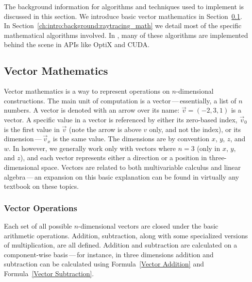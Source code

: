 The background information for algorithms and techniques used to implement \name{} is discussed in this section.
We introduce basic vector mathematics in Section~\ref{ch:intro:background:vector_math}.
In Section~\ref{ch:intro:background:raytracing_math} we detail most of the specific mathematical algorithms involved.
In \name{}, many of these algorithms are implemented behind the scene in APIs like OptiX and CUDA.

\subsection{Vector Mathematics}
\label{ch:intro:background:vector_math}

Vector mathematics is a way to represent operations on $n$-dimensional constructions.
The main unit of computation is a vector\,---\,essentially, a list of $n$ numbers.
A vector is denoted with an arrow over its name: $\vec{v} = (-2, 3, 1)$ is a vector.
A specific value in a vector is referenced by either its zero-based index, $\vec{v}_{0}$ is the first value in $\vec{v}$ (note the arrow is above $v$ only, and not the index), or its dimension\,---\,$\vec{v}_x$ is the same value.
The dimensions are by convention $x$, $y$, $z$, and $w$.
In \name{} however, we generally work only with vectors where $n = 3$ (only in $x$, $y$, and $z$), and each vector represents either a direction or a position in three-dimensional space.
Vectors are related to both multivariable calculus and linear algebra\,---\,an expansion on this basic explanation can be found in virtually any textbook on these topics.

\subsubsection{Vector Operations}

Each set of all possible $n$-dimensional vectors are closed under the basic arithmetic operations.
Addition, subtraction, along with some specialized versions of multiplication, are all defined.
Addition and subtraction are calculated on a component-wise basis\,---\,for instance, in three dimensions addition and subtraction can be calculated using Formula~\ref{Vector Addition} and Formula~\ref{Vector Subtraction}.



